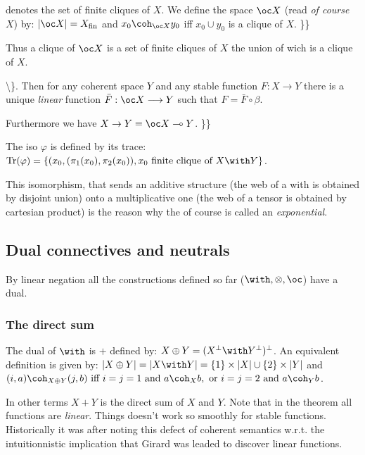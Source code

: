  denotes the set of finite cliques of \(X\). We define the space
\(\oc X\) (read \emph{of course \(X\)}) by:
\(\web{\oc X} = X_{\mathrm{fin}}\) and \(x_0\coh_{\oc X}y_0\) iff
\(x_0\cup y_0\) is a clique of \(X\). \}\}

Thus a clique of \(\oc X\) is a set of finite cliques of \(X\) the union
of wich is a clique of \(X\).

\textbackslash{}\}. Then for any coherent space \(Y\) and any stable
function \(F: X\longrightarrow Y\) there is a unique \emph{linear}
function \(\bar F:\oc X\longrightarrow Y\) such that
\(F = \bar F\circ \beta\).

Furthermore we have \(X\imp Y = \oc X\limp Y\). \}\}

The iso \(\varphi\) is defined by its trace:
\(\mathrm{Tr}(\varphi) = \{(x_0, (\pi_1(x_0), \pi_2(x_0)), x_0\text{ finite clique of } X\with Y\}\).

This isomorphism, that sends an additive structure (the web of a with is
obtained by disjoint union) onto a multiplicative one (the web of a
tensor is obtained by cartesian product) is the reason why the of course
is called an \emph{exponential}.

\subsection{Dual connectives and
neutrals}\label{dual-connectives-and-neutrals}

By linear negation all the constructions defined so far
(\(\with, \tens, \oc\)) have a dual.

\subsubsection{The direct sum}\label{the-direct-sum}

The dual of \(\with\) is \(\plus\) defined by:
\(X\plus Y = (X\orth\with Y\orth)\orth\). An equivalent definition is
given by:
\(\web{X\plus Y} = \web{X\with Y} = \{1\}\times \web X \cup \{2\}\times\web Y\)
and
\((i, a)\coh_{X\plus Y} (j, b)\text{ iff } i = j = 1 \text{ and } a\coh_X b,\text{ or }i = j = 2\text{ and } a\coh_Y b\).

In other terms \(X\plus Y\) is the direct sum of \(X\) and \(Y\). Note
that in the theorem all functions are \emph{linear}. Things doesn't work
so smoothly for stable functions. Historically it was after noting this
defect of coherent semantics w.r.t. the intuitionnistic implication that
Girard was leaded to discover linear functions.

